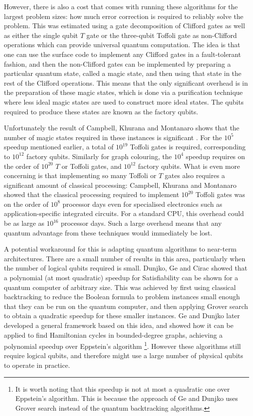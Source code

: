 However, there is also a cost that comes with running these algorithms for the largest problem sizes: how much error correction is required to reliably solve the problem. This was estimated using a gate decomposition of Clifford gates as well as either the single qubit $T$ gate or the three-qubit Toffoli gate as non-Clifford operations which can provide universal quantum computation. The idea is that one can use the surface code to implement any Clifford gates in a fault-tolerant fashion, and then the non-Clifford gates can be implemented by preparing a particular quantum state, called a magic state, and then using that state in the rest of the Clifford operations. This means that the only significant overhead is in the preparation of these magic states, which is done via a purification technique where less ideal magic states are used to construct more ideal states. The qubits required to produce these states are known as the factory qubits.

Unfortunately the result of Campbell, Khurana and Montanaro shows that the number of magic states required in these instances is significant \cite{campbell2019}. For the $10^5$ speedup mentioned earlier, a total of $10^{19}$ Toffoli gates is required, corresponding to $10^{12}$ factory qubits. Similarly for graph colouring, the $10^4$ speedup requires on the order of $10^{20}$ $T$ or Toffoli gates, and $10^{12}$ factory qubits. What is even more concerning is that implementing so many Toffoli or $T$ gates also requires a significant amount of classical processing: Campbell, Khurana and Montanaro showed that the classical processing required to implement $10^{20}$ Toffoli gates was on the order of $10^8$ processor days even for specialised electronics such as application-specific integrated circuits. For a standard CPU, this overhead could be as large as $10^{16}$ processor days. Such a large overhead means that any quantum advantage from these techniques would immediately be lost.

A potential workaround for this is adapting quantum algorithms to near-term architectures. There are a small number of results in this area, particularly when the number of logical qubits required is small. Dunjko, Ge and Cirac \cite{dunjko2018} showed that a polynomial (at most quadratic) speedup for Satisfiability can be shown for a quantum computer of arbitrary size. This was achieved by first using classical backtracking to reduce the Boolean formula to problem instances small enough that they can be run on the quantum computer, and then applying Grover search to obtain a quadratic speedup for these smaller instances. Ge and Dunjko \cite{ge2019} later developed a general framework based on this idea, and showed how it can be applied to find Hamiltonian cycles in bounded-degree graphs, achieving a polynomial speedup over Eppstein's algorithm \cite{eppstein2007}\footnote{It is worth noting that this speedup is not at most a quadratic one over Eppstein's algorithm. This is because the approach of Ge and Dunjko uses Grover search instead of the quantum backtracking algorithms.}. However these algorithms still require logical qubits, and therefore might use a large number of physical qubits to operate in practice.

